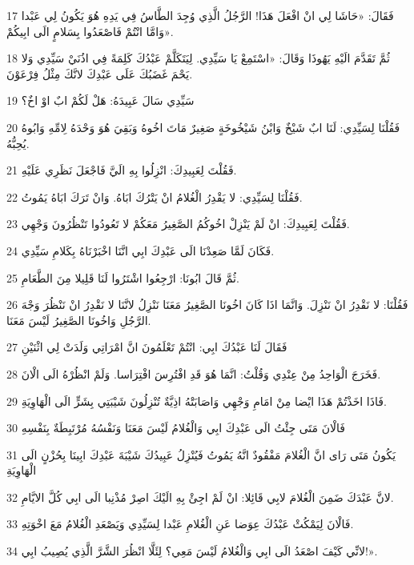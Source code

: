 \par 17 فَقَالَ: «حَاشَا لِي انْ افْعَلَ هَذَا! الرَّجُلُ الَّذِي وُجِدَ الطَّاسُ فِي يَدِهِ هُوَ يَكُونُ لِي عَبْدا وَامَّا انْتُمْ فَاصْعَدُوا بِسَلامٍ الَى ابِيكُمْ».
\par 18 ثُمَّ تَقَدَّمَ الَيْهِ يَهُوذَا وَقَالَ: «اسْتَمِعْ يَا سَيِّدِي. لِيَتَكَلَّمْ عَبْدُكَ كَلِمَةً فِي اذُنَيْ سَيِّدِي وَلا يَحْمَ غَضَبُكَ عَلَى عَبْدِكَ لانَّكَ مِثْلُ فِرْعَوْنَ.
\par 19 سَيِّدِي سَالَ عَبِيدَهُ: هَلْ لَكُمْ ابٌ اوْ اخٌ؟
\par 20 فَقُلْنَا لِسَيِّدِي: لَنَا ابٌ شَيْخٌ وَابْنُ شَيْخُوخَةٍ صَغِيرٌ مَاتَ اخُوهُ وَبَقِيَ هُوَ وَحْدَهُ لِامِّهِ وَابُوهُ يُحِبُّهُ.
\par 21 فَقُلْتَ لِعَبِيدِكَ: انْزِلُوا بِهِ الَيَّ فَاجْعَلَ نَظَرِي عَلَيْهِ.
\par 22 فَقُلْنَا لِسَيِّدِي: لا يَقْدِرُ الْغُلامُ انْ يَتْرُكَ ابَاهُ. وَانْ تَرَكَ ابَاهُ يَمُوتُ.
\par 23 فَقُلْتَ لِعَبِيدِكَ: انْ لَمْ يَنْزِلْ اخُوكُمُ الصَّغِيرُ مَعَكُمْ لا تَعُودُوا تَنْظُرُونَ وَجْهِي.
\par 24 فَكَانَ لَمَّا صَعِدْنَا الَى عَبْدِكَ ابِي انَّنَا اخْبَرْنَاهُ بِكَلامِ سَيِّدِي.
\par 25 ثُمَّ قَالَ ابُونَا: ارْجِعُوا اشْتَرُوا لَنَا قَلِيلا مِنَ الطَّعَامِ.
\par 26 فَقُلْنَا: لا نَقْدِرُ انْ نَنْزِلَ. وَانَّمَا اذَا كَانَ اخُونَا الصَّغِيرُ مَعَنَا نَنْزِلُ لانَّنَا لا نَقْدِرُ انْ نَنْظُرَ وَجْهَ الرَّجُلِ وَاخُونَا الصَّغِيرُ لَيْسَ مَعَنَا.
\par 27 فَقَالَ لَنَا عَبْدُكَ ابِي: انْتُمْ تَعْلَمُونَ انَّ امْرَاتِي وَلَدَتْ لِي اثْنَيْنِ
\par 28 فَخَرَجَ الْوَاحِدُ مِنْ عِنْدِي وَقُلْتُ: انَّمَا هُوَ قَدِ افْتُرِسَ افْتِرَاسا. وَلَمْ انْظُرْهُ الَى الْانَ.
\par 29 فَاذَا اخَذْتُمْ هَذَا ايْضا مِنْ امَامِ وَجْهِي وَاصَابَتْهُ اذِيَّةٌ تُنْزِلُونَ شَيْبَتِي بِشَرٍّ الَى الْهَاوِيَةِ.
\par 30 فَالْانَ مَتَى جِئْتُ الَى عَبْدِكَ ابِي وَالْغُلامُ لَيْسَ مَعَنَا وَنَفْسُهُ مُرْتَبِطَةٌ بِنَفْسِهِ
\par 31 يَكُونُ مَتَى رَاى انَّ الْغُلامَ مَفْقُودٌ انَّهُ يَمُوتُ فَيُنْزِلُ عَبِيدُكَ شَيْبَةَ عَبْدِكَ ابِينَا بِحُزْنٍ الَى الْهَاوِيَةِ
\par 32 لانَّ عَبْدَكَ ضَمِنَ الْغُلامَ لابِي قَائِلا: انْ لَمْ اجِئْ بِهِ الَيْكَ اصِرْ مُذْنِبا الَى ابِي كُلَّ الايَّامِ.
\par 33 فَالْانَ لِيَمْكُثْ عَبْدُكَ عِوَضا عَنِ الْغُلامِ عَبْدا لِسَيِّدِي وَيَصْعَدِ الْغُلامُ مَعَ اخْوَتِهِ.
\par 34 لانِّي كَيْفَ اصْعَدُ الَى ابِي وَالْغُلامُ لَيْسَ مَعِي؟ لِئَلَّا انْظُرَ الشَّرَّ الَّذِي يُصِيبُ ابِي!».

